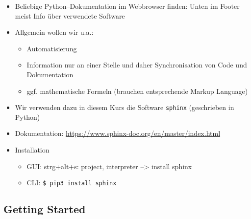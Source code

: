 \begin{itemize}
	\item
	Beliebige Python--Dokumentation im Webbrowser finden: Unten im Footer meist Info über verwendete Software
	\item
	Allgemein wollen wir u.a.:
		\begin{itemize}
			\item
			Automatisierung
			\item
			Information nur an einer Stelle und daher Synchronisation von Code und Dokumentation
			\item ggf. mathematische Formeln (brauchen entsprechende Markup Language)
		\end{itemize}
	\item Wir verwenden dazu in diesem Kurs die Software \texttt{sphinx} (geschrieben in Python)
	\item	Dokumentation: \url{https://www.sphinx-doc.org/en/master/index.html}
	\item	Installation
	\begin{itemize}
		\item
		GUI: strg+alt+s: project, interpreter --\textgreater{} install
		sphinx
		\item
		CLI: \texttt{\$ pip3 install sphinx}
	\end{itemize}
\end{itemize}

\hypertarget{getting-started}{%
	\subsection{\texorpdfstring{Getting
				Started}{Getting Started}}\label{getting-started}}


